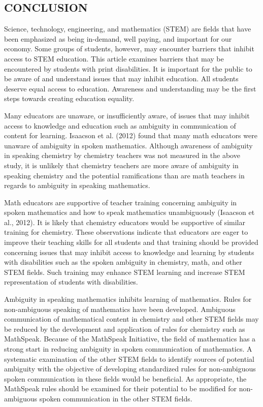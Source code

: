 \documentclass[11.5pt]{sig-alternate} %
\begin{document}
\begin{large}
\section*{CONCLUSION}

Science, technology, engineering, and mathematics (STEM) are fields that have been emphasized as being in-demand, well paying, and important for our economy. Some groups of students, however, may encounter barriers that inhibit access to STEM education. This article examines barriers that may be encountered by students with print disabilities. It is important for the public to be aware of and understand issues that may inhibit education. All students deserve equal access to education. Awareness and understanding may be the first steps towards creating education equality. 

Many educators are unaware, or insufficiently aware, of issues that may inhibit access to knowledge and education such as ambiguity in communication of content for learning. Isaacson et al. (2012) found that many math educators were unaware of ambiguity in spoken mathematics. Although awareness of ambiguity in speaking chemistry by chemistry teachers was not measured in the above study, it is unlikely that chemistry teachers are more aware of ambiguity in speaking chemistry and the potential ramifications than are math teachers in regards to ambiguity in speaking mathematics. 

Math educators are supportive of teacher training concerning ambiguity in spoken mathematics and how to speak mathematics unambiguously (Isaacson et al., 2012). It is likely that chemistry educators would be supportive of similar training for chemistry. These observations indicate that educators are eager to improve their teaching skills for all students and that training should be provided concerning issues that may inhibit access to knowledge and learning by students with disabilities such as the spoken ambiguity in chemistry, math, and other STEM fields. Such training may enhance STEM learning and increase STEM representation of students with disabilities.

Ambiguity in speaking mathematics inhibits learning of mathematics. Rules for non-ambiguous speaking of mathematics have been developed. Ambiguous communication of mathematical content in chemistry and other STEM fields may be reduced by the development and application of rules for chemistry such as MathSpeak. Because of the MathSpeak Initiative, the field of mathematics has a strong start in reducing ambiguity in spoken communication of mathematics. A systematic examination of the other STEM fields to identify sources of potential ambiguity with the objective of developing standardized rules for non-ambiguous spoken communication in these fields would be beneficial. As appropriate, the MathSpeak rules should be examined for their potential to be modified for non-ambiguous spoken communication in the other STEM fields.


\end{large}
\end{document}
